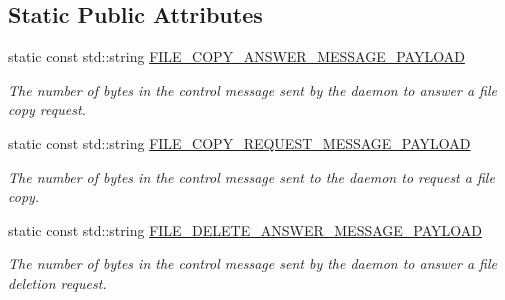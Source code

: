\subsection*{Static Public Attributes}
\begin{DoxyCompactItemize}
\item 
\mbox{\label{classwrench_1_1_storage_service_message_payload_a5adc626683a5ca4e144d3c9fba1e87a2}} 
static const std\+::string \hyperlink{classwrench_1_1_storage_service_message_payload_a5adc626683a5ca4e144d3c9fba1e87a2}{F\+I\+L\+E\+\_\+\+C\+O\+P\+Y\+\_\+\+A\+N\+S\+W\+E\+R\+\_\+\+M\+E\+S\+S\+A\+G\+E\+\_\+\+P\+A\+Y\+L\+O\+AD}
\begin{DoxyCompactList}\small\item\em The number of bytes in the control message sent by the daemon to answer a file copy request. \end{DoxyCompactList}\item 
\mbox{\label{classwrench_1_1_storage_service_message_payload_ab018eb2b5b436d924ae82701f188fa55}} 
static const std\+::string \hyperlink{classwrench_1_1_storage_service_message_payload_ab018eb2b5b436d924ae82701f188fa55}{F\+I\+L\+E\+\_\+\+C\+O\+P\+Y\+\_\+\+R\+E\+Q\+U\+E\+S\+T\+\_\+\+M\+E\+S\+S\+A\+G\+E\+\_\+\+P\+A\+Y\+L\+O\+AD}
\begin{DoxyCompactList}\small\item\em The number of bytes in the control message sent to the daemon to request a file copy. \end{DoxyCompactList}\item 
\mbox{\label{classwrench_1_1_storage_service_message_payload_a59d243acab77dbbd1879d4f1bd5e94a8}} 
static const std\+::string \hyperlink{classwrench_1_1_storage_service_message_payload_a59d243acab77dbbd1879d4f1bd5e94a8}{F\+I\+L\+E\+\_\+\+D\+E\+L\+E\+T\+E\+\_\+\+A\+N\+S\+W\+E\+R\+\_\+\+M\+E\+S\+S\+A\+G\+E\+\_\+\+P\+A\+Y\+L\+O\+AD}
\begin{DoxyCompactList}\small\item\em The number of bytes in the control message sent by the daemon to answer a file deletion request. \end{DoxyCompactList}\item 
\mbox{\label{classwrench_1_1_storage_service_message_payload_ac7a4513d5bd196e1aa345ade9d4863f7}} 

\end{DoxyCompactItemize}
